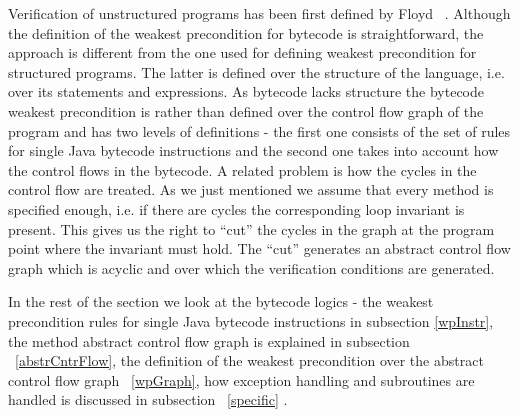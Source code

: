 Verification of unstructured programs has been first defined by Floyd ~\cite{F67amp}. Although the definition of the weakest precondition for bytecode is straightforward, the approach is different from the one used for defining weakest precondition for structured programs. The latter is defined over the structure of the language, i.e. over its statements and expressions. As bytecode lacks structure the bytecode weakest precondition is rather than defined over the control flow graph of the program and has two levels of definitions - the first one consists of the set of rules for single Java bytecode instructions and the second one takes into account how the control flows in the bytecode. A related problem is how the cycles in the control flow are treated. 
As we just mentioned we assume that every method is specified enough, i.e. if there are cycles the corresponding 
loop invariant is present. This gives us the right to ``cut'' the cycles in the graph at the program point where the invariant must hold. 
The ``cut'' generates an abstract control flow graph which is acyclic and over which the verification conditions are generated.  

In the rest of the section we look at the bytecode logics - the weakest precondition rules for single Java bytecode instructions in subsection \ref{wpInstr}, the method abstract control flow graph is explained in subsection ~\ref{abstrCntrFlow}, the definition of the weakest precondition over the abstract control flow graph ~\ref{wpGraph}, how exception handling and subroutines are handled is discussed in subsection ~\ref{specific} .











